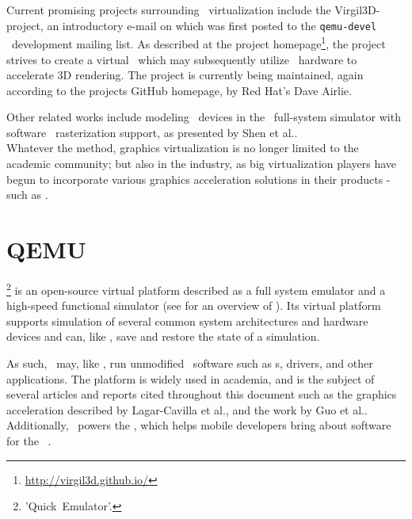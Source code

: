 Current promising projects surrounding \dvttermgpu\ virtualization include the Virgil3D-project, an introductory e-mail on which was first posted to the \texttt{qemu-devel} \dvttermqemu\ development mailing list.
As described at the project homepage\footnote{\url{http://virgil3d.github.io/}}, the project strives to create a virtual \dvttermgpu\ which may subsequently utilize \dvttermhost\ hardware to accelerate 3D rendering.
The project is currently being maintained, again according to the projects GitHub homepage, by Red Hat's Dave Airlie.

Other related works include modeling \dvttermgpu\ devices in the \dvttermqemu\ full-system simulator with software \dvttermopengles\ rasterization support, as presented by Shen et al..\\

\noindent
Whatever the method, graphics virtualization is no longer limited to the academic community; but also in the industry, as big virtualization players have begun to incorporate various graphics acceleration solutions in their products - such as \dvttermvmware {}.

\section{QEMU}
\label{sec:relatedwork_qemu}
\dvttermqemu \footnote{'Quick~Emulator'.} is an open-source virtual platform described as a full system emulator and a high-speed functional simulator (see  for an overview of \dvttermqemu ).
Its virtual platform supports simulation of several common system architectures and hardware devices and can, like \dvttermsimics , save and restore the state of a simulation.

As such, \dvttermqemu\ may, like \dvttermsimics , run unmodified \dvttermtarget\ software such as \dvttermos s, drivers, and other applications.
The platform is widely used in academia, and is the subject of several articles and reports cited throughout this document such as the graphics acceleration described by Lagar-Cavilla et al., and the work by Guo et al..
Additionally, \dvttermqemu\ powers the \dvttermandroidemulator , which helps mobile developers bring about software for the \dvttermandroid\ \dvttermos .

